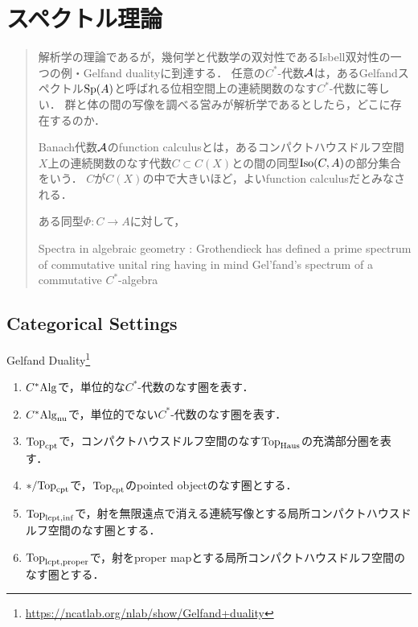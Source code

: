\documentclass[uplatex,dvipdfmx]{jsreport}
\begin{document}
\chapter{スペクトル理論}

\begin{quotation}
    解析学の理論であるが，幾何学と代数学の双対性であるIsbell双対性の一つの例・Gelfand dualityに到達する．
    任意の$C^*$-代数$\mathcal{A}$は，あるGelfandスペクトル$\mathrm{Sp}(A)$と呼ばれる位相空間上の連続関数のなす$C^*$-代数に等しい．
    群と体の間の写像を調べる営みが解析学であるとしたら，どこに存在するのか．

    Banach代数$\mathcal{A}$のfunction calculusとは，あるコンパクトハウスドルフ空間$X$上の連続関数のなす代数$C\subset C(X)$との間の同型$\mathrm{Iso}(C,A)$の部分集合をいう．
    $C$が$C(X)$の中で大きいほど，よいfunction calculusだとみなされる．

    ある同型$\Phi:C\to A$に対して，

    Spectra in algebraic geometry : 
    Grothendieck has defined a prime spectrum of commutative unital ring having in mind Gel'fand's spectrum of a commutative $C^*$-algebra
\end{quotation}

\section{Categorical Settings}

\begin{tcolorbox}[colframe=ForestGreen, colback=ForestGreen!10!white,breakable,colbacktitle=ForestGreen!40!white,coltitle=black,fonttitle=\bfseries\sffamily,
title=]
    Gelfand Duality\footnote{\url{https://ncatlab.org/nlab/show/Gelfand+duality}}
\end{tcolorbox}

\begin{notation}\mbox{}
    \begin{enumerate}
        \item $C^*\mathrm{Alg}$で，単位的な$C^*$-代数のなす圏を表す．
        \item $C^*\mathrm{Alg}_{\mathrm{nu}}$で，単位的でない$C^*$-代数のなす圏を表す．
        \item $\mathrm{Top}_{\mathrm{cpt}}$で，コンパクトハウスドルフ空間のなす$\mathrm{Top}_{\mathrm{Haus}}$の充満部分圏を表す．
        \item $*/\mathrm{Top}_{\mathrm{cpt}}$で，$\mathrm{Top}_{\mathrm{cpt}}$のpointed objectのなす圏とする．
        \item $\mathrm{Top}_{\mathrm{lcpt},\mathrm{inf}}$で，射を無限遠点で消える連続写像とする局所コンパクトハウスドルフ空間のなす圏とする．
        \item $\mathrm{Top}_{\mathrm{lcpt},\mathrm{proper}}$で，射をproper mapとする局所コンパクトハウスドルフ空間のなす圏とする．
    \end{enumerate}
\end{notation}
\end{document}

